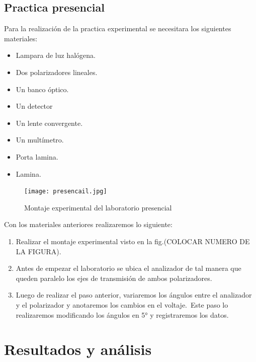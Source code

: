 \documentclass{article}
\begin{document}
\begin{multicols}{2}
	\subsection*{Practica presencial}
	Para la realización de la practica experimental se necesitara los siguientes materiales:
	\begin{itemize}
	\item Lampara de luz halógena.
	\item Dos polarizadores lineales.
	\item Un banco óptico.
	\item Un detector
	\item Un lente convergente.
	\item Un multímetro.
	\item Porta lamina.
	\item Lamina.
	\end{itemize}
	\begin{figure}[H]
	\centering
	\texttt{[image: presencail.jpg]}
	\caption{Montaje experimental del laboratorio presencial}
	\label{fig:enter-label}
	\end{figure}
	Con los materiales anteriores realizaremos lo siguiente:
	\begin{enumerate}
	\item Realizar el montaje experimental visto en la fig.(COLOCAR NUMERO DE LA FIGURA).
	\item Antes de empezar el laboratorio se ubica el analizador de tal manera que queden paralelo los ejes de transmisión de ambos polarizadores.
	\item Luego de realizar el paso anterior, variaremos los ángulos entre el analizador y el polarizador y anotaremos los cambios en el voltaje.\
	Este paso lo realizaremos modificando los ángulos en 5° y registraremos los datos.
	\end{enumerate}
	\section*{Resultados y análisis}

\end{multicols}
\end{document}
